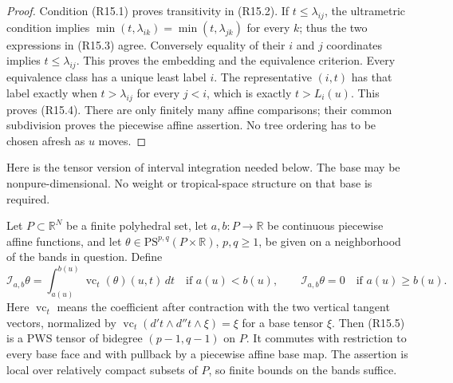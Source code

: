 \begin{proof}
Condition (R15.1) proves transitivity in (R15.2).  If $t\leq
\lambda_{ij}$, the ultrametric condition implies
$\min(t,\lambda_{ik})=\min(t,\lambda_{jk})$ for every $k$;
thus the two expressions in (R15.3) agree.  Conversely equality of their
$i$ and $j$ coordinates implies $t\leq\lambda_{ij}$.  This proves the
embedding and the equivalence criterion.  Every equivalence class has
a unique least label $i$.  The representative $(i,t)$ has that label
exactly when $t>\lambda_{ij}$ for every $j<i$, which is exactly
$t>L_i(u)$.  This proves (R15.4).  There are only finitely many affine
comparisons; their common subdivision proves the piecewise affine
assertion.  No tree ordering has to be chosen afresh as $u$ moves.
\end{proof}

Here is the tensor version of interval integration needed below.  The
base may be nonpure-dimensional.  No weight or tropical-space structure
on that base is required.

\begin{lemma}
\label{r15ray:band}
Let $P\subset\mathbb R^N$ be a finite polyhedral set, let
$a,b:P\to\mathbb R$ be continuous piecewise affine functions, and let
$\theta\in\mathrm{PS}^{p,q}(P\times\mathbb R)$, $p,q\geq1$,
be given on a neighborhood of the bands in question.  Define
\[
 \mathcal I_{a,b}\theta
 =\int_{a(u)}^{b(u)}\operatorname{vc}_t(\theta)(u,t)\,dt
       \quad\text{if }a(u)<b(u),
 \qquad \mathcal I_{a,b}\theta=0\quad\text{if }a(u)\geq b(u).
                                                        \tag{R15.5}
\]
Here $\operatorname{vc}_t$ means the coefficient after contraction
with the two vertical tangent vectors, normalized by
$\operatorname{vc}_t(d't\wedge d''t\wedge\xi)=\xi$ for a base tensor
$\xi$.  Then (R15.5) is a PWS tensor of bidegree $(p-1,q-1)$ on $P$.
It commutes with restriction to every base face and with pullback by
a piecewise affine base map.  The assertion is local over relatively
compact subsets of $P$, so finite bounds on the bands suffice.
\end{lemma}

